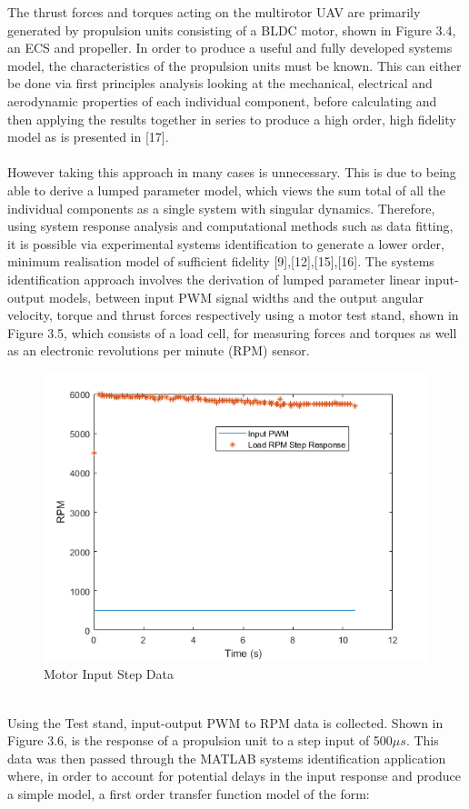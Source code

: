 \documentclass[12pt,a4paper,twoside]{report}
\begin{document}
			The thrust forces and torques acting on the multirotor UAV are primarily generated by propulsion units consisting of a BLDC motor, shown in Figure 3.4, an ECS and propeller. In order to produce a useful and fully developed systems model, the characteristics of the propulsion units must be known. This can either be done via first principles analysis looking at the mechanical, electrical and aerodynamic properties of each individual component, before calculating and then applying the results together in series to produce a high order, high fidelity model as is presented in [17]. 
			\\ \\
			However taking this approach in many cases is unnecessary. This is due to being able to derive a lumped parameter model, which views the sum total of all the individual components as a single system with singular dynamics. Therefore, using system response analysis and computational methods such as data fitting, it is possible via experimental systems identification to generate a lower order, minimum realisation model of sufficient fidelity [9],[12],[15],[16]. The systems identification approach involves the derivation of lumped parameter linear input-output models, between input PWM signal widths and the output angular velocity, torque and thrust forces respectively using a motor test stand, shown in Figure 3.5, which consists of a load cell, for measuring forces and torques as well as an electronic revolutions per minute (RPM) sensor.
			\\
			\begin{figure}[h!]
				\centering
				\includegraphics[width=0.7\linewidth]{InputStepData.png}
				\caption{Motor Input Step Data}
				\label{fig:inputstepdata}
			\end{figure}
			\\
			Using the Test stand, input-output PWM to RPM data is collected. Shown in Figure 3.6, is the response of a propulsion unit to a step input of 500$\mu s$. This data was then passed through the MATLAB systems identification application where, in order to account for potential delays in the input response and produce a simple model, a first order transfer function model of the form:
\end{document}
